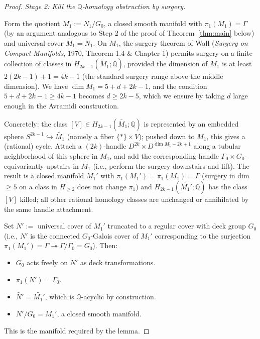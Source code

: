 \documentclass[12pt]{article}
\theoremstyle{definition}
\begin{document}
\begin{proof}
\medskip

\noindent\emph{Stage 2: Kill the $\mathbb{Q}$-homology obstruction by surgery.}

Form the quotient $M_1:=N_1/G_0$, a closed smooth manifold with $\pi_1(M_1)=\Gamma$ (by an argument analogous to Step 2 of the proof of Theorem~\ref{thm:main} below) and universal cover $\widetilde{M_1}=\widetilde{N_1}$. On $M_1$, the surgery theorem of Wall (\emph{Surgery on Compact Manifolds}, 1970, Theorem 1.4 \& Chapter 1) permits surgery on a finite collection of classes in $H_{2k-1}(\widetilde{M_1};\mathbb{Q})$, provided the dimension of $M_1$ is at least $2(2k-1)+1=4k-1$ (the standard surgery range above the middle dimension). We have $\dim M_1=5+d+2k-1$, and the condition $5+d+2k-1\geq 4k-1$ becomes $d\geq 2k-5$, which we ensure by taking $d$ large enough in the Avramidi construction.

Concretely: the class $[V]\in H_{2k-1}(\widetilde{M_1};\mathbb{Q})$ is represented by an embedded sphere $S^{2k-1}\hookrightarrow\widetilde{M_1}$ (namely a fiber $\{*\}\times V$); pushed down to $M_1$, this gives a (rational) cycle. Attach a $(2k)$-handle $D^{2k}\times D^{\dim M_1-2k+1}$ along a tubular neighborhood of this sphere in $M_1$, and add the corresponding handle $\Gamma_0\times G_0$-equivariantly upstairs in $\widetilde{M_1}$ (i.e., perform the surgery downstairs and lift). The result is a closed manifold $M_1'$ with $\pi_1(M_1')=\pi_1(M_1)=\Gamma$ (surgery in dim $\geq 5$ on a class in $H_{\geq 2}$ does not change $\pi_1$) and $H_{2k-1}(\widetilde{M_1'};\mathbb{Q})$ has the class $[V]$ killed; all other rational homology classes are unchanged or annihilated by the same handle attachment.

Set $N':=$ universal cover of $M_1'$ truncated to a regular cover with deck group $G_0$ (i.e., $N'$ is the connected $G_0$-Galois cover of $M_1'$ corresponding to the surjection $\pi_1(M_1')=\Gamma\twoheadrightarrow\Gamma/\Gamma_0=G_0$). Then:
\begin{itemize}[leftmargin=2em]
\item $G_0$ acts freely on $N'$ as deck transformations.
\item $\pi_1(N')=\Gamma_0$.
\item $\widetilde{N'}=\widetilde{M_1'}$, which is $\mathbb{Q}$-acyclic by construction.
\item $N'/G_0=M_1'$, a closed smooth manifold.
\end{itemize}

This is the manifold required by the lemma.
\end{proof}
\end{document}
